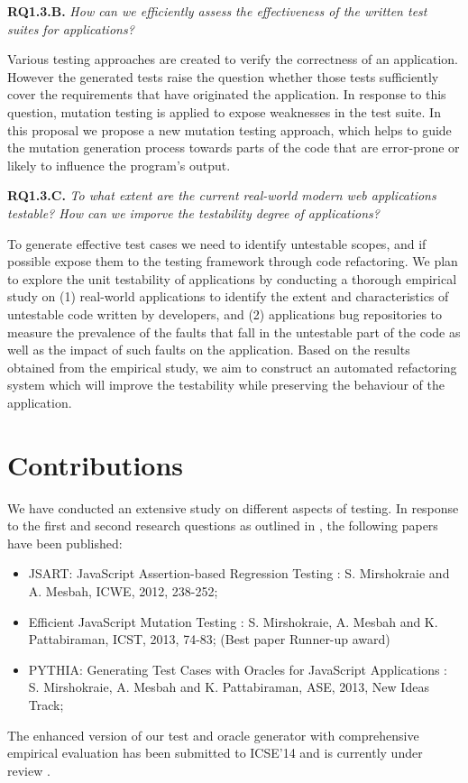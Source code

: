 {\bf RQ1.3.B.} \emph{How can we efficiently assess the effectiveness of the written test suites for \javascript applications?}

Various testing approaches are created to verify the correctness of an application. However the generated tests raise the question whether those tests sufficiently cover the requirements that have originated the application.  In response to this question, mutation testing is applied to expose weaknesses in the test suite.
In this proposal we propose a new \javascript mutation testing approach, which helps to guide the
mutation generation process towards parts of the code that are error-prone or likely to influence the program's
output.

{\bf RQ1.3.C.} \emph{To what extent are the current real-world modern \javascript web applications testable? How can we imporve the testability degree of \javascript applications?}

To generate effective test cases we need to identify untestable scopes, and if possible expose them to the
testing framework through code refactoring.
We plan to explore the unit testability of \javascript applications by conducting a thorough
empirical study on (1) real-world \javascript applications to identify the extent and characteristics of untestable code written
by developers, and (2) \javascript applications bug repositories to measure the prevalence of the faults
that fall in the untestable part of the code as well as the impact of such faults on the application.
Based on the results obtained from the empirical study, we aim to construct an automated refactoring system which will improve the testability while preserving the behaviour of the application.

\section{Contributions} \label{Sec:contrib}
We have conducted an
extensive study on different aspects of \javascript testing. In response to the first and second research questions as outlined in , the following papers have been published:
\begin{itemize} [noitemsep, nolistsep]
\item JSART: JavaScript Assertion-based Regression Testing \cite{mirshokraie:icwe12}:
S. Mirshokraie and A. Mesbah, ICWE, 2012, 238-252;
\item Efficient JavaScript Mutation Testing \cite{mirshokraie:icst13}:
S. Mirshokraie, A. Mesbah and K. Pattabiraman, ICST, 2013, 74-83; (Best paper Runner-up award)
\item PYTHIA: Generating Test Cases with Oracles
for JavaScript Applications \cite{shabnam:ase13}: 
S. Mirshokraie, A. Mesbah and K. Pattabiraman, ASE, 2013, New Ideas Track;
\end{itemize}
The enhanced version of our test and oracle generator with comprehensive empirical evaluation has been submitted to ICSE'14 and is currently under review \cite{submitted-mirshokraie:icse14}.

